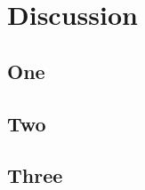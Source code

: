 
\chapter{Discussion}
\begin{spacing}{1.5}
\setlength{\parskip}{0.3in}

\section{One}


\section{Two}

\section{Three}


\end{spacing}
\newpage
